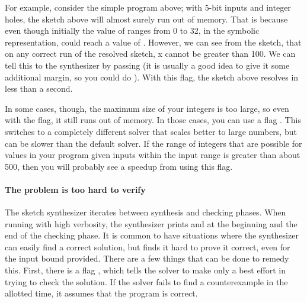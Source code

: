 For example, consider the simple program above; with 5-bit inputs and
integer holes, the sketch above will almost surely run out of memory.
That is because even though initially the value of  ranges from 0 to 32,
in the symbolic representation,  could reach a value of .
However, we can see from the sketch, that on any correct run of the resolved
sketch, x cannot be greater than 100. We can tell this to the
synthesizer by passing  (it is usually a good
idea to give it some additional margin, so you could do ).
With this flag, the sketch above resolves in less than a second.

In some cases, though, the maximum size of your integers is too large,
so even with the  flag, it still runs out of memory.
In those cases, you can use a flag . This switches to a completely
different solver that scales better to large numbers, but can be slower than
the default solver. If the range of integers that are possible for values in
your program given inputs within the input range is greater than about 500,
then you will probably see a speedup from using this flag.





\paragraph{The problem is too hard to verify}
The sketch synthesizer iterates between synthesis and checking phases.
When running with high verbosity, the synthesizer prints 
and  at the beginning and the end of the checking phase.
It is common to have situations where the synthesizer can easily find
a correct solution, but finds it hard to prove it correct, even for
the input bound provided. There are a few things that can
be done to remedy this.
First, there is a flag , which tells the solver to
make only a best effort in trying to check the solution. If the solver
fails to find a counterexample in the allotted time, it assumes that the
program is correct.

